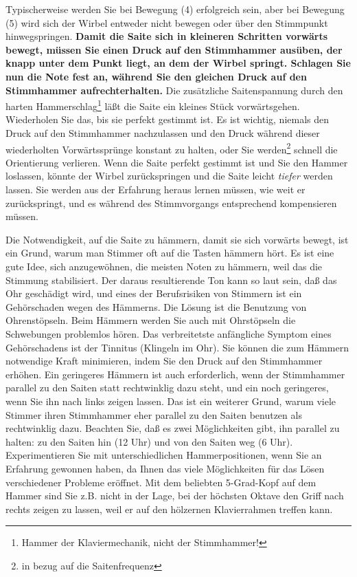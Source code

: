 Typischerweise werden Sie bei Bewegung (4) erfolgreich sein, aber bei Bewegung (5) wird sich der Wirbel entweder nicht bewegen oder über den Stimmpunkt hinwegspringen.
\textbf{Damit die Saite sich in kleineren Schritten vorwärts bewegt, müssen Sie einen Druck auf den Stimmhammer ausüben, der knapp unter dem Punkt liegt, an dem der Wirbel springt.
Schlagen Sie nun die Note fest an, während Sie den gleichen Druck auf den Stimmhammer aufrechterhalten.}
Die zusätzliche Saitenspannung durch den harten Hammerschlag\footnote{Hammer der Klaviermechanik, nicht der Stimmhammer!} läßt die Saite ein kleines Stück vorwärtsgehen.
Wiederholen Sie das, bis sie perfekt gestimmt ist.
Es ist wichtig, niemals den Druck auf den Stimmhammer nachzulassen und den Druck während dieser wiederholten Vorwärtssprünge konstant zu halten, oder Sie werden\footnote{in bezug auf die Saitenfrequenz} schnell die Orientierung verlieren.
Wenn die Saite perfekt gestimmt ist und Sie den Hammer loslassen, könnte der Wirbel zurückspringen und die Saite leicht \textit{tiefer} werden lassen. Sie werden aus der Erfahrung heraus lernen müssen, wie weit er zurückspringt, und es während des Stimmvorgangs entsprechend kompensieren müssen.

Die Notwendigkeit, auf die Saite zu hämmern, damit sie sich vorwärts bewegt, ist ein Grund, warum man Stimmer oft auf die Tasten hämmern hört.
Es ist eine gute Idee, sich anzugewöhnen, die meisten Noten zu hämmern, weil das die Stimmung stabilisiert.
Der daraus resultierende Ton kann so laut sein, daß das Ohr geschädigt wird, und eines der Berufsrisiken von Stimmern ist ein Gehörschaden wegen des Hämmerns.
Die Lösung ist die Benutzung von Ohrenstöpseln.
Beim Hämmern werden Sie auch mit Ohrstöpseln die Schwebungen problemlos hören.
Das verbreitetste anfängliche Symptom eines Gehörschadens ist der Tinnitus (Klingeln im Ohr).
Sie können die zum Hämmern notwendige Kraft minimieren, indem Sie den Druck auf den Stimmhammer erhöhen.
Ein geringeres Hämmern ist auch erforderlich, wenn der Stimmhammer parallel zu den Saiten statt rechtwinklig dazu steht, und ein noch geringeres, wenn Sie ihn nach links zeigen lassen.
Das ist ein weiterer Grund, warum viele Stimmer ihren Stimmhammer eher parallel zu den Saiten benutzen als rechtwinklig dazu.
Beachten Sie, daß es zwei Möglichkeiten gibt, ihn parallel zu halten: zu den Saiten hin (12 Uhr) und von den Saiten weg (6 Uhr).
Experimentieren Sie mit unterschiedlichen Hammerpositionen, wenn Sie an Erfahrung gewonnen haben, da Ihnen das viele Möglichkeiten für das Lösen verschiedener Probleme eröffnet.
Mit dem beliebten 5-Grad-Kopf auf dem Hammer sind Sie z.B. nicht in der Lage, bei der höchsten Oktave den Griff nach rechts zeigen zu lassen, weil er auf den hölzernen Klavierrahmen treffen kann.
 

